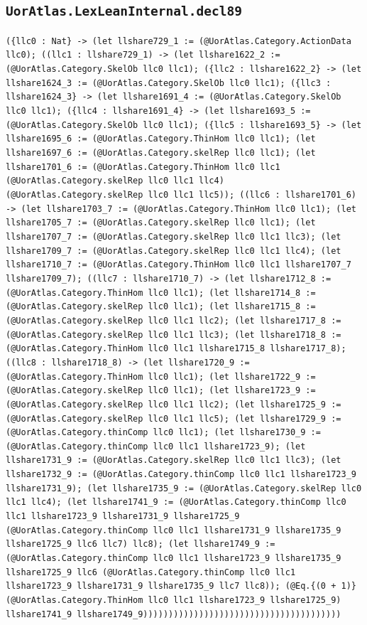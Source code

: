 \documentclass[11pt]{article}
\begin{document}
\subsection*{\texttt{UorAtlas.LexLeanInternal.decl89}}
\noindent\texttt{(\{llc0 : Nat\} -> (let llshare729\_1 := (@UorAtlas.Category.ActionData llc0); ((llc1 : llshare729\_1) -> (let llshare1622\_2 := (@UorAtlas.Category.SkelOb llc0 llc1); (\{llc2 : llshare1622\_2\} -> (let llshare1624\_3 := (@UorAtlas.Category.SkelOb llc0 llc1); (\{llc3 : llshare1624\_3\} -> (let llshare1691\_4 := (@UorAtlas.Category.SkelOb llc0 llc1); (\{llc4 : llshare1691\_4\} -> (let llshare1693\_5 := (@UorAtlas.Category.SkelOb llc0 llc1); (\{llc5 : llshare1693\_5\} -> (let llshare1695\_6 := (@UorAtlas.Category.ThinHom llc0 llc1); (let llshare1697\_6 := (@UorAtlas.Category.skelRep llc0 llc1); (let llshare1701\_6 := (@UorAtlas.Category.ThinHom llc0 llc1 (@UorAtlas.Category.skelRep llc0 llc1 llc4) (@UorAtlas.Category.skelRep llc0 llc1 llc5)); ((llc6 : llshare1701\_6) -> (let llshare1703\_7 := (@UorAtlas.Category.ThinHom llc0 llc1); (let llshare1705\_7 := (@UorAtlas.Category.skelRep llc0 llc1); (let llshare1707\_7 := (@UorAtlas.Category.skelRep llc0 llc1 llc3); (let llshare1709\_7 := (@UorAtlas.Category.skelRep llc0 llc1 llc4); (let llshare1710\_7 := (@UorAtlas.Category.ThinHom llc0 llc1 llshare1707\_7 llshare1709\_7); ((llc7 : llshare1710\_7) -> (let llshare1712\_8 := (@UorAtlas.Category.ThinHom llc0 llc1); (let llshare1714\_8 := (@UorAtlas.Category.skelRep llc0 llc1); (let llshare1715\_8 := (@UorAtlas.Category.skelRep llc0 llc1 llc2); (let llshare1717\_8 := (@UorAtlas.Category.skelRep llc0 llc1 llc3); (let llshare1718\_8 := (@UorAtlas.Category.ThinHom llc0 llc1 llshare1715\_8 llshare1717\_8); ((llc8 : llshare1718\_8) -> (let llshare1720\_9 := (@UorAtlas.Category.ThinHom llc0 llc1); (let llshare1722\_9 := (@UorAtlas.Category.skelRep llc0 llc1); (let llshare1723\_9 := (@UorAtlas.Category.skelRep llc0 llc1 llc2); (let llshare1725\_9 := (@UorAtlas.Category.skelRep llc0 llc1 llc5); (let llshare1729\_9 := (@UorAtlas.Category.thinComp llc0 llc1); (let llshare1730\_9 := (@UorAtlas.Category.thinComp llc0 llc1 llshare1723\_9); (let llshare1731\_9 := (@UorAtlas.Category.skelRep llc0 llc1 llc3); (let llshare1732\_9 := (@UorAtlas.Category.thinComp llc0 llc1 llshare1723\_9 llshare1731\_9); (let llshare1735\_9 := (@UorAtlas.Category.skelRep llc0 llc1 llc4); (let llshare1741\_9 := (@UorAtlas.Category.thinComp llc0 llc1 llshare1723\_9 llshare1731\_9 llshare1725\_9 (@UorAtlas.Category.thinComp llc0 llc1 llshare1731\_9 llshare1735\_9 llshare1725\_9 llc6 llc7) llc8); (let llshare1749\_9 := (@UorAtlas.Category.thinComp llc0 llc1 llshare1723\_9 llshare1735\_9 llshare1725\_9 llc6 (@UorAtlas.Category.thinComp llc0 llc1 llshare1723\_9 llshare1731\_9 llshare1735\_9 llc7 llc8)); (@Eq.\{(0 + 1)\} (@UorAtlas.Category.ThinHom llc0 llc1 llshare1723\_9 llshare1725\_9) llshare1741\_9 llshare1749\_9)))))))))))))))))))))))))))))))))))))))}\par
\end{document}
